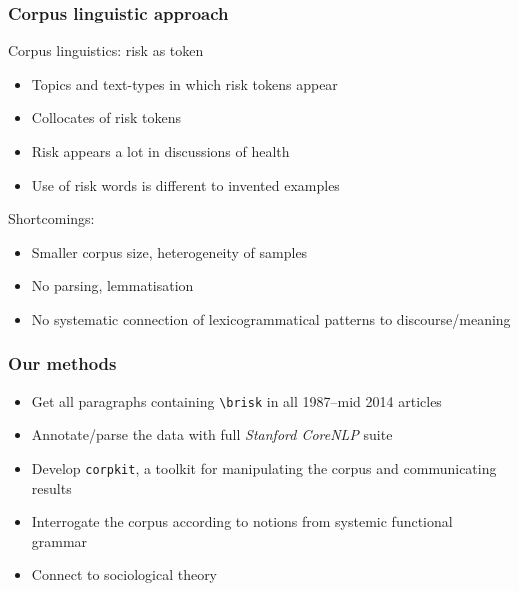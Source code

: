 \documentclass{beamer}       %
\begin{document}
\begin{frame}
    \frametitle{Corpus linguistic approach}

    Corpus linguistics: risk as token \cite{hamilton_meanings_2007}

    \begin{itemize}
    \item Topics and text-types in which risk tokens appear
    \item Collocates of risk tokens
    \item Risk appears a lot in discussions of health
    \item Use of risk words is different to invented examples
    \end{itemize}

    Shortcomings:

    \begin{itemize}
        \item Smaller corpus size, heterogeneity of samples
        \item No parsing, lemmatisation
        \item No systematic connection of lexicogrammatical patterns to discourse\slash meaning
    \end{itemize}

\end{frame}

\begin{frame}
    \frametitle{Our methods}
    
    \begin{itemize}
    \item Get all paragraphs containing \texttt{\textbackslash brisk} in all 1987--mid 2014 articles
    \item Annotate\slash parse the data with full \emph{Stanford CoreNLP} suite
    \item Develop \texttt{corpkit}, a toolkit for manipulating the corpus and communicating results
    \item Interrogate the corpus according to notions from systemic functional grammar
    \item Connect to sociological theory
    \end{itemize}
\end{frame}
\end{document}
